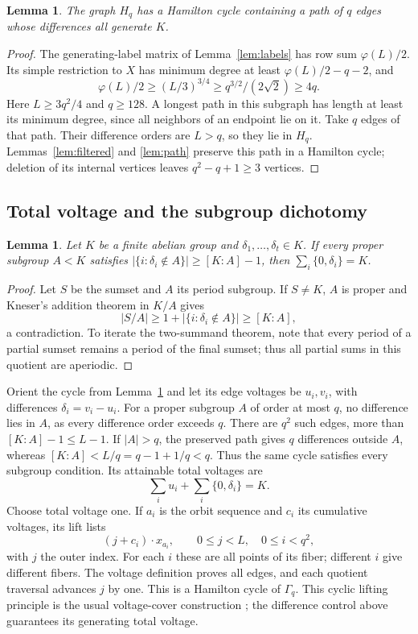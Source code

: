 \documentclass[11pt]{article}
\newtheorem{lemma}[theorem]{Lemma}
\theoremstyle{definition}
\begin{document}
\begin{lemma}\label{lem:generatorpath}
The graph $H_q$ has a Hamilton cycle containing a path of $q$ edges whose differences all generate $K$.
\end{lemma}
\begin{proof}
The generating-label matrix of Lemma~\ref{lem:labels} has row sum $\varphi(L)/2$. Its simple restriction to $X$ has minimum degree at least $\varphi(L)/2-q-2$, and
\[
\varphi(L)/2\ge(L/3)^{3/4}\ge q^{3/2}/(2\sqrt2)\ge4q.
\]
Here $L\ge3q^2/4$ and $q\ge128$. A longest path in this subgraph has length at least its minimum degree, since all neighbors of an endpoint lie on it. Take $q$ edges of that path. Their difference orders are $L>q$, so they lie in $H_q$. Lemmas~\ref{lem:filtered} and \ref{lem:path} preserve this path in a Hamilton cycle; deletion of its internal vertices leaves $q^2-q+1\ge3$ vertices.
\end{proof}

\subsection{Total voltage and the subgroup dichotomy}
\begin{lemma}\label{lem:kneser}
Let $K$ be a finite abelian group and $\delta_1,\ldots,\delta_t\in K$. If every proper subgroup $A<K$ satisfies $|\{i:\delta_i\notin A\}|\ge[K:A]-1$, then $\sum_i\{0,\delta_i\}=K$.
\end{lemma}
\begin{proof}
Let $S$ be the sumset and $A$ its period subgroup. If $S\ne K$, $A$ is proper and Kneser's addition theorem \cite{Kneser} in $K/A$ gives
\[
|S/A|\ge1+|\{i:\delta_i\notin A\}|\ge[K:A],
\]
a contradiction. To iterate the two-summand theorem, note that every period of a partial sumset remains a period of the final sumset; thus all partial sums in this quotient are aperiodic.
\end{proof}
Orient the cycle from Lemma~\ref{lem:generatorpath} and let its edge voltages be $u_i,v_i$, with differences $\delta_i=v_i-u_i$. For a proper subgroup $A$ of order at most $q$, no difference lies in $A$, as every difference order exceeds $q$. There are $q^2$ such edges, more than $[K:A]-1\le L-1$. If $|A|>q$, the preserved path gives $q$ differences outside $A$, whereas $[K:A]<L/q=q-1+1/q<q$. Thus the same cycle satisfies every subgroup condition. Its attainable total voltages are
\[
\sum_i u_i+\sum_i\{0,\delta_i\}=K.
\]
Choose total voltage one. If $a_i$ is the orbit sequence and $c_i$ its cumulative voltages, its lift lists
\[
(j+c_i)\cdot x_{a_i},\qquad 0\le j<L,\quad0\le i<q^2,
\]
with $j$ the outer index. For each $i$ these are all points of its fiber; different $i$ give different fibers. The voltage definition proves all edges, and each quotient traversal advances $j$ by one. This is a Hamilton cycle of $\Gamma_q$. This cyclic lifting principle is the usual voltage-cover construction \cite{GrossTucker}; the difference control above guarantees its generating total voltage.
\end{document}
